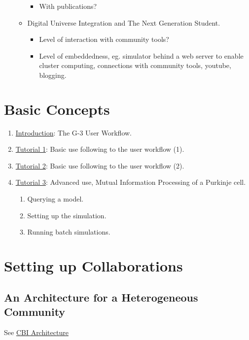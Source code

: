 \documentclass[12pt]{article}
\begin{document}
\begin{enumerate}
\begin{itemize}
\begin{itemize}
    \item With publications?
    \end{itemize}
  \item Digital Universe Integration and The Next Generation Student.
    \begin{itemize}
    \item Level of interaction with community tools?
    \item Level of embeddedness, eg. simulator behind a web server to
      enable cluster computing, connections with community tools,
      youtube, blogging.
    \end{itemize}
  \end{itemize}
\end{enumerate}

\section{Basic Concepts}

\begin{enumerate}
\item \href{../workflow-user/workflow-user.tex}{Introduction}: The G-3 User Workflow.
\item \href{../tutorial1/tutorial1.tex}{Tutorial 1}: Basic use following to the user workflow (1).
\item \href{../tutorial2/tutorial2.tex}{Tutorial 2}: Basic use following to the user workflow (2).
\item \href{../tutorial3/tutorial3.tex}{Tutorial 3}: Advanced use,
  Mutual Information Processing of a Purkinje cell.
  \begin{enumerate}
  \item Querying a model.
  \item Setting up the simulation.
  \item Running batch simulations.
  \end{enumerate}
\end{enumerate}


\section{Setting up Collaborations}

\subsection{An Architecture for a Heterogeneous Community}

See \href{../genesis-overview/genesis-overview.tex}{CBI Architecture}
\end{document}
